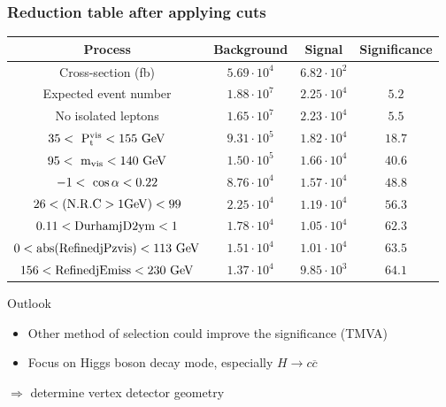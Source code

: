 \documentclass{beamer}
\begin{document}
\begin{frame}
    \frametitle{Reduction table after applying cuts}

    \hspace{-0.7cm}
    \centering 
    \footnotesize{ 
                \begin{tabular}{c c c c}
      \hline
      Process                                     & Background          & Signal              & Significance  \tabularnewline
      \hline
      \hline
      Cross-section (fb)                          & $5.69 \cdot 10^{4}$ & $6.82 \cdot 10^{2}$ &               \tabularnewline
      \hline
      Expected event number                       & $1.88 \cdot 10^{7}$ & $2.25 \cdot 10^{4}$ & $5.2$         \tabularnewline
      No isolated leptons                         & $1.65 \cdot 10^{7}$ & $2.23 \cdot 10^{4}$ & $5.5$         \tabularnewline
      {$35 <~\rm{{P}_{t}^{vis}} < 155~\rm{GeV} $} & $9.31 \cdot 10^{5}$ & $1.82 \cdot 10^{4}$ & $18.7$        \tabularnewline
      {$95 <~\rm{m_{vis}}< 140~\rm{GeV}$}         & $1.50 \cdot 10^{5}$ & $1.66 \cdot 10^{4}$ & $40.6$        \tabularnewline
      {$-1 <~\rm{\cos{\alpha}}< 0.22$}            & $8.76 \cdot 10^{4}$ & $1.57 \cdot 10^{4}$ & $48.8$        \tabularnewline
      $26 < (\rm{N.R.C > 1GeV}) < 99$             & $2.25 \cdot 10^{4}$ & $1.19 \cdot 10^{4}$ & $56.3$        \tabularnewline
      $0.11 < \rm{DurhamjD2ym} < 1$               & $1.78 \cdot 10^{4}$ & $1.05 \cdot 10^{4}$ & $62.3$        \tabularnewline
      $0 < \rm{abs(RefinedjPzvis)} < 113~\rm{GeV}$& $1.51 \cdot 10^{4}$ & $1.01 \cdot 10^{4}$ & $63.5$        \tabularnewline
      $156 < \rm{RefinedjEmiss} < 230~\rm{GeV}$   & $1.37 \cdot 10^{4}$ & $9.85 \cdot 10^{3}$ & $64.1$        \tabularnewline      
      \hline %
    \end{tabular}
   }
   \begin{block}{Outlook}
     \begin{itemize}
       \item Other method of selection could improve the significance (TMVA)
       \item Focus on Higgs boson decay mode, especially $H \rightarrow c \overline{c}$ 
     \end{itemize}
     \centering
     $\Rightarrow$ determine vertex detector geometry  
   \end{block}
\end{frame}

\end{document}
